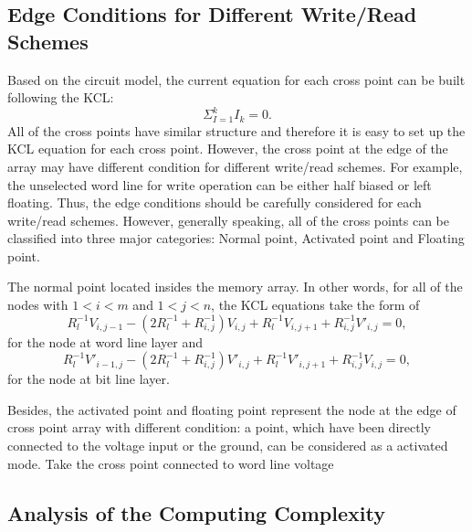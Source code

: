 \subsection{Edge Conditions for Different Write/Read Schemes}
Based on the circuit model, the current equation for each cross point can be built following the KCL:
\begin{equation}
  {\Sigma}_{I=1}^kI_k=0.
\end{equation}
All of the cross points have similar structure and therefore it is easy to set up the KCL equation for each cross point. However, the cross point at the edge of the array may have different condition for different write/read schemes. For example, the unselected word line for write operation can be either half biased or left floating. Thus, the edge conditions should be carefully considered for each write/read schemes. However, generally speaking, all of the cross points can be classified into three major categories: Normal point, Activated point and Floating point. 

The normal point located insides the memory array. In other words, for all of the nodes with $1<i<m$ and $1<j<n$, the KCL equations take the form of 
\begin{equation}
R_l^{-1}V_{i,j-1} -(2R_l^{-1}+R_{i,j}^{-1})V_{i,j}+ R_l^{-1}V_{i,j+1}+R_{i,j}^{-1}V'_{i,j}=0,
\end{equation}
for the node at word line layer and 
\begin{equation}
R_l^{-1}V'_{i-1,j} -(2R_l^{-1}+R_{i,j}^{-1})V'_{i,j}+ R_l^{-1}V'_{i,j+1}+R_{i,j}^{-1}V_{i,j}=0,
\end{equation}
for the node at bit line layer.

Besides, the activated point and floating point represent the node at the edge of cross point array with different condition: a point, which have been directly connected to the voltage input or the ground, can be considered as a activated mode. Take the cross point connected to word line voltage 
\subsection{Analysis of the Computing Complexity}
